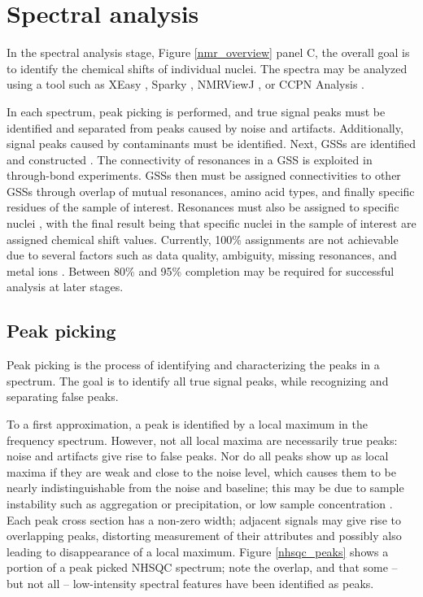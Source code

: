\section{Spectral analysis}

In the spectral analysis stage, Figure \ref{nmr_overview} panel C,
the overall goal is to identify the chemical shifts of individual nuclei.
The spectra may be analyzed using a tool such as XEasy \cite{xeasy}, 
Sparky \cite{sparky}, NMRViewJ \cite{nmrviewj}, or CCPN Analysis \cite{ccpn}.  

In each spectrum, peak picking is performed, and true signal peaks must 
be identified and separated from peaks caused by noise and artifacts.  
Additionally, signal peaks caused by contaminants must be identified.  
Next, GSSs are identified and constructed \cite{ccpn}. 
The connectivity of resonances in a GSS is exploited 
in through-bond experiments.  GSSs then must be assigned 
connectivities to other GSSs through overlap of mutual resonances, 
amino acid types, and finally specific residues of the sample of interest. 
Resonances must also be assigned to specific nuclei \cite{ccpn}, 
with the final result being that specific nuclei in the sample of interest 
are assigned chemical shift values.  Currently, 100\% assignments are not 
achievable due to several factors such as data quality, ambiguity,
missing resonances, and metal ions \cite{guerry2011automated}.
Between 80\% and 95\% completion may be required \cite{williamson2009automated}
for successful analysis at later stages.

\subsection*{Peak picking}
Peak picking is the process of identifying and characterizing the peaks in 
a spectrum.  The goal is to identify all true signal peaks, while recognizing
and separating false peaks.

To a first approximation, a peak is identified by a local maximum in the 
frequency spectrum.  However, not all local maxima are necessarily true
peaks: noise and artifacts give rise to false peaks.  Nor do all peaks show 
up as local maxima if 
they are weak and close to the noise level, which causes them 
to be nearly indistinguishable from the noise and baseline; this may be due to 
sample instability such as aggregation or precipitation, or low sample 
concentration \cite{picky, munin, korzhnev2001munin, apart, autopsy, pine}
\cite{williamson2009automated, guntert2009automated, altieri2004automation,
baran2004automated}.
Each peak cross section has a non-zero width; adjacent signals may give rise
to overlapping peaks, distorting measurement of their attributes and possibly
also leading to disappearance of a local maximum.
Figure \ref{nhsqc_peaks} shows a portion of a peak picked
NHSQC spectrum; note the overlap, and that some -- but not
all -- low-intensity spectral features have been identified as peaks.

